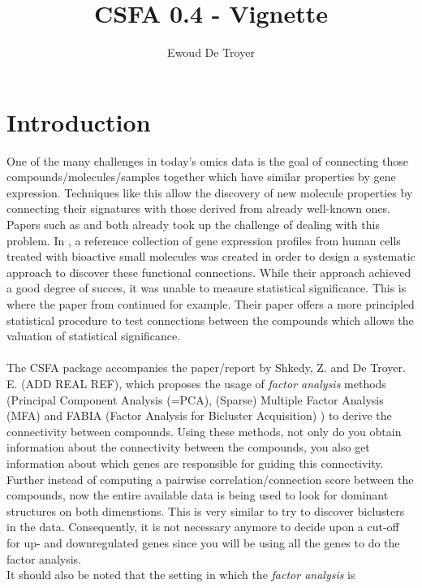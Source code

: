 \documentclass[a4paper]{article}\usepackage[]{graphicx}\usepackage[]{color}
\title{CSFA 0.4 - Vignette}
\date{}
\author{Ewoud De Troyer}
\begin{document}
\maketitle
\section{Introduction}

One of the many challenges in today's omics data is the goal of connecting those
compounds/molecules/samples together which have similar properties by gene
expression.
Techniques like this allow the discovery of new molecule properties by
connecting their signatures with those derived from already well-known ones.\\
Papers such as \citet{Lamb2006} and \citet{Zhang2008} both already took up the
challenge of dealing with this problem. In \citet{Lamb2006}, a reference
collection of gene expression profiles from human cells treated with bioactive
small molecules was created in order to design a systematic approach to discover
these functional connections. While their approach achieved a good degree of
succes, it was unable to measure statistical significance. This is where the
paper from \citet{Zhang2008} continued for example. Their paper offers a more
principled statistical procedure to test connections between the compounds which allows the valuation of statistical significance.
\\ \\
The CSFA package accompanies the paper/report by Shkedy, Z. and De Troyer. E. (ADD REAL REF),
which proposes the usage of {\it factor analysis} methods (Principal Component
Analysis (=PCA), (Sparse) Multiple Factor Analysis (MFA) \citep{Abdi2013} and
FABIA (Factor Analysis for Bicluster Acquisition) \citep{Hochreiter2010}) to
derive the connectivity between compounds.
Using these methods, not only do you obtain information about the connectivity between the compounds, you also get
information about which genes are responsible for guiding this connectivity.\\
Further instead of computing a pairwise correlation/connection score between the
compounds, now the entire available data is being used to look for dominant structures on both dimenstions. This is very similar to try to discover biclusters in the data. Consequently, it is not necessary anymore to decide upon a cut-off for up- and downregulated genes since you will be using all the genes to do the factor analysis.
\\
It should also be noted that the setting in which the {\it factor analysis} is
\end{document}
